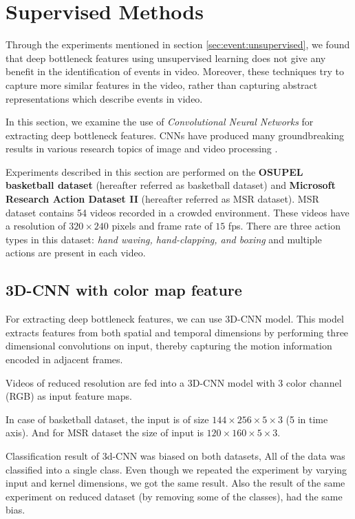 \section{Supervised Methods}
\label{sec:event:supervised}
Through the experiments mentioned in section  \ref{sec:event:unsupervised}, we found that deep bottleneck features using unsupervised learning does not give any benefit in the identification of events in video.  Moreover, these techniques try to capture more similar features in the video, rather than capturing abstract representations which describe events in video.

In this section, we examine the use of \textit{Convolutional Neural Networks} for extracting deep bottleneck features.  CNNs have produced many groundbreaking results in various research topics of image and video processing \citep{KarpathyCVPR14, ji20133d, krizhevsky2012imagenet}.

Experiments described in this section are performed on the \textbf{OSUPEL basketball dataset} \cite{brendel2011probabilistic} (hereafter referred as basketball dataset) and \textbf{Microsoft Research Action Dataset \RN{2}} (hereafter referred as MSR dataset).  MSR dataset contains 54 videos recorded in a crowded environment.  These videos have a resolution of $320 \times 240$ pixels and frame rate of $15$ fps.  There are three action types in this dataset: \textit{hand waving, hand-clapping, and boxing } and multiple actions are present in each video.

\subsection{3D-CNN with color map feature}
For extracting deep bottleneck features, we can use 3D-CNN model.  This model extracts features from both spatial and temporal dimensions by performing three dimensional convolutions on input, thereby capturing the motion information encoded in adjacent frames\citep{ji20133d}.

Videos of reduced resolution are fed into a 3D-CNN model with 3 color channel (RGB) as input feature maps.

In case of basketball dataset, the input is of size $144 \times 256 \times 5 \times 3$ (5 in time axis).  And for MSR dataset the size of input is $120 \times 160 \times 5 \times 3$.

Classification result of 3d-CNN was biased on both datasets, All of the data was classified into a single class.  Even though we repeated the experiment by varying input and kernel dimensions, we got the same result.  Also the result of the same experiment on reduced dataset (by removing some of the classes), had the same bias.

